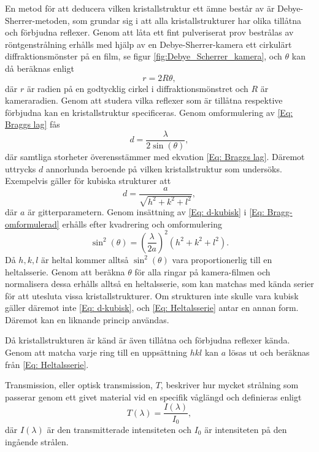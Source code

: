 \documentclass[12pt, a4paper]{article}
\begin{document}
En metod för att deducera vilken kristallstruktur ett ämne består av är Debye-Sherrer-metoden, som grundar sig i att alla kristallstrukturer har olika tillåtna och förbjudna reflexer. Genom att låta ett fint pulveriserat prov bestrålas av röntgenstrålning erhålls med hjälp av en Debye-Sherrer-kamera ett cirkulärt diffraktionsmönster på en film, se figur \ref{fig:Debye_Scherrer_kamera}, och $\theta$ kan då beräknas enligt 
 \begin{equation}
     r = 2R\theta,
     \label{Eq:theta från cirkel}
 \end{equation}
där $r$ är radien på en godtycklig cirkel i diffraktionsmönstret och $R$ är kameraradien. Genom att studera vilka reflexer som är tillåtna respektive förbjudna kan en kristallstruktur specificeras. Genom omformulering av \ref{Eq: Braggs lag} fås
\begin{equation}
    d = \dfrac{\lambda}{2\sin(\theta)},
    \label{Eq: Bragg-omformulerad}
\end{equation}
där samtliga storheter överensstämmer med ekvation \ref{Eq: Braggs lag}. Däremot uttrycks $d$ annorlunda beroende på vilken kristallstruktur som undersöks. Exempelvis gäller för kubiska strukturer att
\begin{equation}
    d = \dfrac{a}{\sqrt{h^2+k^2+l^2}},
    \label{Eq: d-kubisk}
\end{equation}
där $a$ är gitterparametern. Genom insättning av \ref{Eq: d-kubisk} i \ref{Eq: Bragg-omformulerad} erhålls efter kvadrering och omformulering
\begin{equation}
    \sin^2(\theta) = \left(\dfrac{\lambda}{2a}\right)^2 (h^2+k^2+l^2).
    \label{Eq: Heltalsserie}
\end{equation}
Då $h,k,l$ är heltal kommer alltså $\sin^2(\theta)$ vara proportionerlig till en heltalsserie. Genom att beräkna $\theta$ för alla ringar på kamera-filmen och normalisera dessa erhålls alltså en heltalsserie, som kan matchas med kända serier för att utesluta vissa kristallstrukturer. Om strukturen inte skulle vara kubisk gäller däremot inte \ref{Eq: d-kubisk}, och \ref{Eq: Heltalsserie} antar en annan form. Däremot kan en liknande princip användas\cite{X-raylabbPM}.

Då kristallstrukturen är känd är även tillåtna och förbjudna reflexer kända. Genom att matcha varje ring till en uppsättning $hkl$ kan $a$ lösas ut och beräknas från \ref{Eq: Heltalsserie}.

Transmission, eller optisk transmission, $T$, beskriver hur mycket strålning som passerar genom ett givet material vid en specifik våglängd och definieras enligt
\begin{equation}
    T(\lambda) = \frac{I(\lambda)}{I_0},
\end{equation}
där $I(\lambda)$ är den transmitterade intensiteten och $I_0$ är intensiteten på den ingående strålen\cite{Transmission}.
\end{document}
